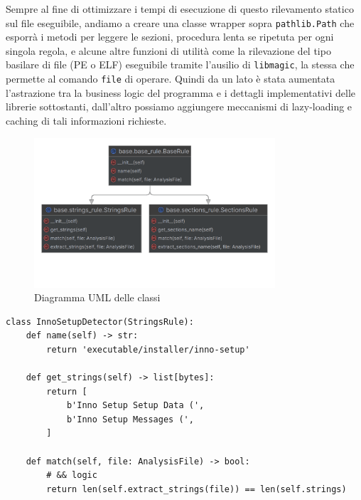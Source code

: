 Sempre al fine di ottimizzare i tempi di esecuzione di questo rilevamento statico sul file eseguibile,
andiamo a creare una classe wrapper sopra \texttt{pathlib.Path} che esporrà i metodi per leggere le sezioni, procedura lenta se ripetuta per ogni singola regola, e alcune altre funzioni di utilità come la rilevazione del tipo basilare di file (PE o ELF) eseguibile tramite l'ausilio di \texttt{libmagic}, la stessa che permette al comando \texttt{file} di operare.
Quindi da un lato è stata aumentata l'astrazione tra la business logic del programma e i dettagli implementativi delle librerie sottostanti, dall'altro possiamo aggiungere meccanismi di lazy-loading e caching di tali informazioni richieste.

\begin{figure}[H]
    \centering
    \includegraphics[width = 0.8\textwidth]{assets/base_custom_static_analyzer.png}
    \caption{Diagramma UML delle classi}
    \label{fig:base_custom_static_analyzer_uml}
\end{figure}

\begin{code}
    \begin{verbatim}
class InnoSetupDetector(StringsRule):
    def name(self) -> str:
        return 'executable/installer/inno-setup'

    def get_strings(self) -> list[bytes]:
        return [
            b'Inno Setup Setup Data (',
            b'Inno Setup Messages (',
        ]

    def match(self, file: AnalysisFile) -> bool:
        # && logic
        return len(self.extract_strings(file)) == len(self.strings)
    \end{verbatim}
    \caption{Regola di riconoscimento di InnoSetup, usando la nuova architettura}
    \label{code:innosetup_custom_recognizer}
\end{code}

